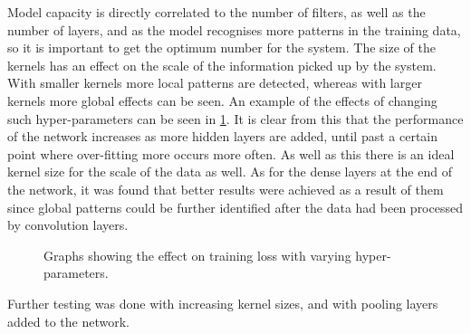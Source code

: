 Model capacity is directly correlated to the number of filters, as well as the number of layers, and as the model recognises more patterns in the training data, so it is important to get the optimum number for the system. The size of the kernels has an effect on the scale of the information picked up by the system. With smaller kernels more local patterns are detected, whereas with larger kernels more global effects can be seen. An example of the effects of changing such hyper-parameters can be seen in \cref{fig:hyperparameter_tests}. It is clear from this that the performance of the network increases as more hidden layers are added, until past a certain point where over-fitting more occurs more often. As well as this there is an ideal kernel size for the scale of the data as well. As for the dense layers at the end of the network, it was found that better results were achieved as a result of them since global patterns could be further identified after the data had been processed by convolution layers.

\begin{figure}[htb]%
    \centering
    \caption{Graphs showing the effect on training loss with varying hyper-parameters.}%
    \label{fig:hyperparameter_tests}%
\end{figure}

Further testing was done with increasing kernel sizes, and with pooling layers added to the network. 

